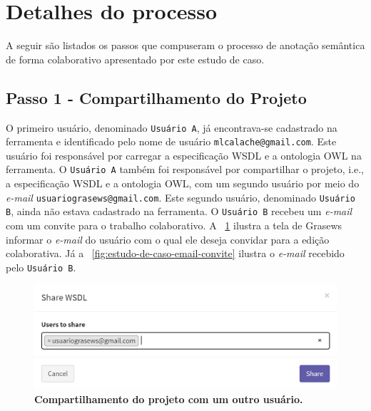 \section{Detalhes do processo}\label{5-estudo-de-caso-processo-detalhado}

A seguir são listados os passos que compuseram o processo de anotação semântica de forma colaborativo apresentado por este estudo de caso.

\subsection{Passo 1 - Compartilhamento do Projeto}\label{estudo-de-caso-passo1-ambiente-de-trabalho-compartilhado}

O primeiro usuário, denominado \texttt{Usuário A}, já encontrava-se cadastrado na ferramenta e identificado pelo nome de usuário \texttt{mlcalache@gmail.com}. Este usuário foi responsável por carregar a especificação WSDL e a ontologia OWL na ferramenta. O \texttt{Usuário A} também foi responsável por compartilhar o projeto, i.e., a especificação WSDL e a ontologia OWL, com um segundo usuário por meio do \textit{e-mail} \texttt{usuariograsews@gmail.com}. Este segundo usuário, denominado \texttt{Usuário B}, ainda não estava cadastrado na ferramenta. O \texttt{Usuário B} recebeu um \textit{e-mail} com um convite para o trabalho colaborativo. A \figurename~\ref{fig:estudo-de-caso-compartilhar-com-email} ilustra a tela de Grasews informar o \textit{e-mail} do usuário com o qual ele deseja convidar para a edição colaborativa. Já a \figurename~\ref{fig:estudo-de-caso-email-convite} ilustra o \textit{e-mail} recebido pelo \texttt{Usuário B}.

    \begin{figure}[h]
            \includegraphics[scale=0.7]{5-grasews-estudo-de-caso/imagens/estudo-de-caso-compartilhar-com-email.png}
        \centering
        \caption[Compartilhamento do projeto com um outro usuário]{\textbf{Compartilhamento do projeto com um outro usuário.}}
        \label{fig:estudo-de-caso-compartilhar-com-email}
    \end{figure}

